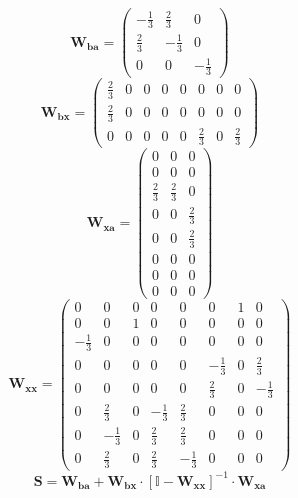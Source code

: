 \[ \mathbf{W_{ba}} = \left(\begin{array}{ccc} -\frac{1}{3} &
\frac{2}{3} & 0 \\ \frac{2}{3} & -\frac{1}{3} & 0 \\ 0 & 0 &
-\frac{1}{3} \end{array}\right) \]
\[ \mathbf{W_{bx}} = \left(\begin{array}{cccccccc} \frac{2}{3} & 0 & 0
& 0 & 0 & 0 & 0 & 0 \\ \frac{2}{3} & 0 & 0 & 0 & 0 & 0 & 0 & 0 \\ 0 &
0 & 0 & 0 & 0 & \frac{2}{3} & 0 & \frac{2}{3} \end{array}\right) \]
\[ \mathbf{W_{xa}} = \left(\begin{array}{ccc} 0 & 0 & 0 \\ 0 & 0 & 0
\\ \frac{2}{3} & \frac{2}{3} & 0 \\ 0 & 0 & \frac{2}{3} \\ 0 & 0 &
\frac{2}{3} \\ 0 & 0 & 0 \\ 0 & 0 & 0 \\ 0 & 0 & 0 \end{array}\right)
\]
\[ \mathbf{W_{xx}} = \left(\begin{array}{cccccccc} 0 & 0 & 0 & 0 & 0 &
0 & 1 & 0 \\ 0 & 0 & 1 & 0 & 0 & 0 & 0 & 0 \\ -\frac{1}{3} & 0 & 0 & 0
& 0 & 0 & 0 & 0 \\ 0 & 0 & 0 & 0 & 0 & -\frac{1}{3} & 0 & \frac{2}{3}
\\ 0 & 0 & 0 & 0 & 0 & \frac{2}{3} & 0 & -\frac{1}{3} \\ 0 &
\frac{2}{3} & 0 & -\frac{1}{3} & \frac{2}{3} & 0 & 0 & 0 \\ 0 &
-\frac{1}{3} & 0 & \frac{2}{3} & \frac{2}{3} & 0 & 0 & 0 \\ 0 &
\frac{2}{3} & 0 & \frac{2}{3} & -\frac{1}{3} & 0 & 0 & 0
\end{array}\right) \]
\[ \mathbf{S}=\mathbf{W_{ba}}+\mathbf{W_{bx}}\cdot\left[ \mathbb{I}
-\mathbf{W_{xx}}\right]^{-1}\cdot\mathbf{W_{xa}} \]
